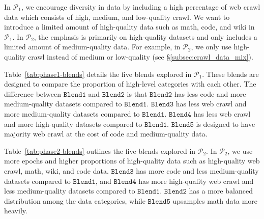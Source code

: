 \documentclass[11pt]{article}
\newcommand{\todo}[1]{{\color{red}\bf [TODO: #1]}\xspace}
\newcommand{\citereq}[1]{{\color{blue}\bf [CITE]}\xspace}
\newcommand{\phaseone}{$\mathcal{P}_1$\xspace}
\newcommand{\phasetwo}{$\mathcal{P}_2$\xspace}
\begin{document}
In \phaseone, we encourage diversity in data by including a high percentage of web crawl data which consists of high, medium, and low-quality crawl.
We want to introduce a limited amount of high-quality data such as math, code, and wiki in \phaseone. 
In \phasetwo, the emphasis is primarily on high-quality datasets and only includes a limited amount of medium-quality data.
For example, in \phasetwo, we only use high-quality crawl instead of medium or low-quality (see \S\ref{subsec:crawl_data_mix}).

Table~\ref{tab:phase1-blends} details the five blends explored in \phaseone. These blends are designed to compare the proportion of high-level categories with each other. The difference between $\mathtt{Blend1}$ and $\mathtt{Blend2}$ is that $\mathtt{Blend2}$ has less code and more medium-quality datasets compared to $\mathtt{Blend1}$. $\mathtt{Blend3}$ has less web crawl and more medium-quality datasets compared to $\mathtt{Blend1}$. $\mathtt{Blend4}$ has less web crawl and more high-quality datasets compared to $\mathtt{Blend1}$. $\mathtt{Blend5}$ is designed to have majority web crawl at the cost of code and medium-quality data.


Table~\ref{tab:phase2-blends} outlines the five blends explored in \phasetwo.
In \phasetwo, we use more epochs and higher proportions of high-quality data such as high-quality web crawl, math, wiki, and code data.
$\mathtt{Blend3}$ has more code and less medium-quality datasets compared to $\mathtt{Blend1}$, and $\mathtt{Blend4}$ has more high-quality web crawl and less medium-quality datasets compared to $\mathtt{Blend1}$. 
$\mathtt{Blend2}$ has a more balanced distribution among the data categories, while $\mathtt{Blend5}$ upsamples math data more heavily. %
\end{document}
